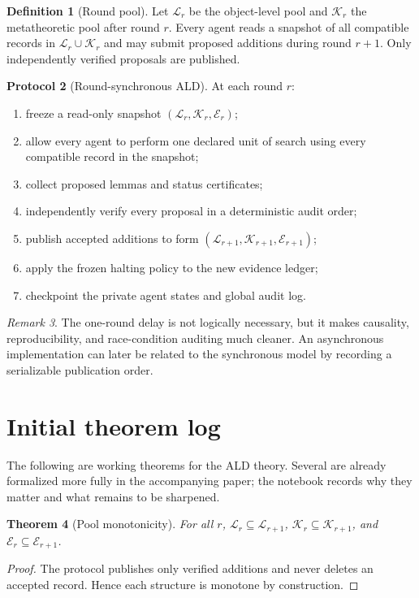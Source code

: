 \documentclass[11pt]{article}
\newtheorem{theorem}{Theorem}[section]
\theoremstyle{definition}
\newtheorem{definition}[theorem]{Definition}
\newtheorem{protocol}[theorem]{Protocol}
\theoremstyle{remark}
\newtheorem{remark}[theorem]{Remark}
\newcommand{\Pool}{\mathcal L}
\newcommand{\MetaPool}{\mathcal K}
\newcommand{\Ev}{\mathcal E}
\begin{document}
\begin{definition}[Round pool]
Let $\Pool_r$ be the object-level pool and $\MetaPool_r$ the metatheoretic pool after round $r$. Every agent reads a snapshot of all compatible records in $\Pool_r\cup\MetaPool_r$ and may submit proposed additions during round $r+1$. Only independently verified proposals are published.
\end{definition}

\begin{protocol}[Round-synchronous ALD]
At each round $r$:
\begin{enumerate}
  \item freeze a read-only snapshot $(\Pool_r,\MetaPool_r,\Ev_r)$;
  \item allow every agent to perform one declared unit of search using every compatible record in the snapshot;
  \item collect proposed lemmas and status certificates;
  \item independently verify every proposal in a deterministic audit order;
  \item publish accepted additions to form $(\Pool_{r+1},\MetaPool_{r+1},\Ev_{r+1})$;
  \item apply the frozen halting policy to the new evidence ledger;
  \item checkpoint the private agent states and global audit log.
\end{enumerate}
\end{protocol}

\begin{remark}
The one-round delay is not logically necessary, but it makes causality, reproducibility, and race-condition auditing much cleaner. An asynchronous implementation can later be related to the synchronous model by recording a serializable publication order.
\end{remark}

\section{Initial theorem log}

The following are working theorems for the ALD theory. Several are already formalized more fully in the accompanying paper; the notebook records why they matter and what remains to be sharpened.

\begin{theorem}[Pool monotonicity]
For all $r$, $\Pool_r\subseteq\Pool_{r+1}$, $\MetaPool_r\subseteq\MetaPool_{r+1}$, and $\Ev_r\subseteq\Ev_{r+1}$.
\end{theorem}
\begin{proof}
The protocol publishes only verified additions and never deletes an accepted record. Hence each structure is monotone by construction.
\end{proof}
\end{document}

